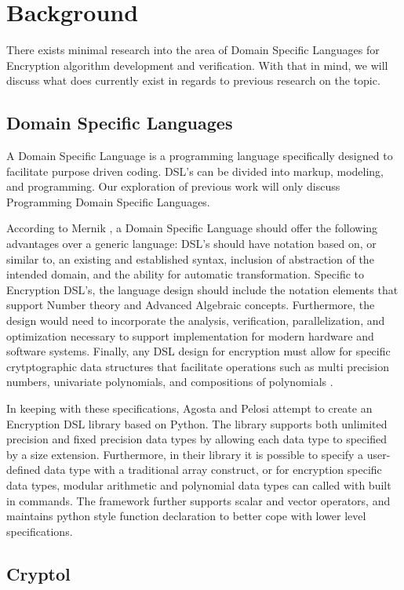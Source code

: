\section{Background}
There exists minimal research into the area of Domain Specific Languages for Encryption algorithm development and verification. With that in mind, we will discuss what does currently exist in regards to previous research on the topic.

\subsection{Domain Specific Languages}
 A Domain Specific Language is a programming language specifically designed to facilitate purpose driven coding. DSL's can be divided into markup, modeling, and programming. Our exploration of previous work will only discuss Programming Domain Specific Languages. 

According to Mernik \cite{Mernik}, a Domain Specific Language should offer the following advantages over a generic language: DSL's should have notation based on, or similar to, an existing and established syntax, inclusion of abstraction of the intended domain, and the ability for automatic transformation. Specific to Encryption DSL's, the language design should include the notation elements that support Number theory and Advanced Algebraic concepts. Furthermore, the design would need to incorporate the analysis, verification, parallelization, and optimization necessary to support implementation for modern hardware and software systems. Finally, any DSL design for encryption must allow for specific crytptographic data structures that facilitate operations such as multi precision numbers, univariate polynomials, and compositions of polynomials \cite{Agosta}.

In keeping with these specifications, Agosta and Pelosi \cite{agosta} attempt to create an  Encryption DSL library based on Python. The library supports both unlimited precision and fixed precision data types by allowing each data type to specified by a size extension. Furthermore, in their library it is possible to specify a user-defined data type with a traditional array construct, or for encryption specific data types, modular arithmetic and polynomial data types can called with built in commands. The framework further supports scalar and vector operators, and maintains python style function declaration to better cope with lower level specifications.
\subsection{Cryptol}

